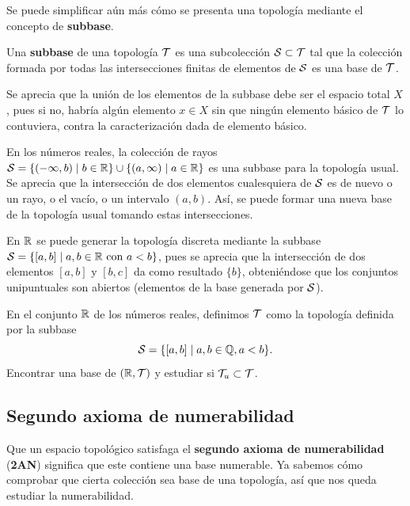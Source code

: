 Se puede simplificar aún más cómo se presenta una topología mediante el concepto de {\bf subbase}.

\begin{deff}
    Una {\bf subbase} de una topología $\mathcal{T}$ es una subcolección $\mathcal{S}\subset\mathcal{T}$ tal que la colección formada por todas las intersecciones finitas de elementos de $\mathcal{S}$ es una base de $\mathcal{T}$.
\end{deff}

Se aprecia que la unión de los elementos de la subbase debe ser el espacio total $X$, pues si no, habría algún elemento $x\in X$ sin que ningún elemento básico de $\mathcal{T}$ lo contuviera, contra la caracterización dada de elemento básico.

\begin{ejs}
    \item En los números reales, la colección de rayos $\mathcal{S} = \{(-\infty,b) \mid b \in \mathbb{R}\} \cup \{(a, \infty) \mid a \in \mathbb{R}\}$ es una subbase para la topología usual. Se aprecia que la intersección de dos elementos cualesquiera de $\mathcal{S}$ es de nuevo o un rayo, o el vacío, o un intervalo $(a,b)$. Así, se puede formar una nueva base de la topología usual tomando estas intersecciones.
    \item En $\mathbb{R}$ se puede generar la topología discreta mediante la subbase $\mathcal{S} = \{[a,b] \mid a,b \in \mathbb{R} \text{ con } a < b\}$, pues se aprecia que la intersección de dos elementos $[a,b]$ y $[b,c]$ da como resultado $\{b\}$, obteniéndose que los conjuntos unipuntuales son abiertos (elementos de la base generada por $\mathcal{S}$).
\end{ejs}

\begin{ex}
    En el conjunto \(\mathbb{R}\) de los números reales, definimos \(\mathcal{T}\) como la topología definida por la subbase \[\mathcal{S} = \{[a,b] \mid a, b \in \mathbb{Q}, a < b\}.\]
    Encontrar una base de \((\mathbb{R},\mathcal{T})\) y estudiar si \(\mathcal{T}_u \subset \mathcal{T}\).
\end{ex}

\subsection*{Segundo axioma de numerabilidad}

Que un espacio topológico satisfaga el {\bf segundo axioma de numerabilidad} ({\bf 2AN}) significa que este contiene una base numerable. Ya sabemos cómo comprobar que cierta colección sea base de una topología, así que nos queda estudiar la numerabilidad.

